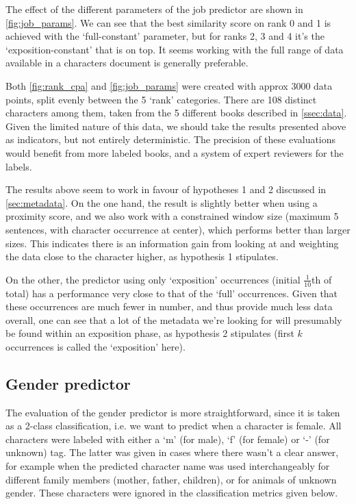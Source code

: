 The effect of the different parameters of the job predictor are shown in \cref{fig:job_params}. We can see that the best similarity score on rank 0 and 1 is achieved with the `full-constant' parameter, but for ranks 2, 3 and 4 it's the `exposition-constant' that is on top. It seems working with the full range of data available in a characters document is generally preferable.

Both \cref{fig:rank_cpa} and \cref{fig:job_params} were created with approx 3000 data points, split evenly between the 5 `rank' categories. There are 108 distinct characters among them, taken from the 5 different books described in \cref{ssec:data}. Given the limited nature of this data, we should take the results presented above as indicators, but not entirely deterministic. The precision of these evaluations would benefit from more labeled books, and a system of expert reviewers for the labels.

The results above seem to work in favour of hypotheses 1 and 2 discussed in \cref{sec:metadata}. On the one hand, the result is slightly better when using a proximity score, and we also work with a constrained window size (maximum 5 sentences, with character occurrence at center), which performs better than larger sizes. This indicates there is an information gain from looking at and weighting the data close to the character higher, as hypothesis 1 stipulates. 

On the other, the predictor using only `exposition' occurrences (initial $\frac{1}{10}$th of total) has a performance very close to that of the `full' occurrences. Given that these occurrences are much fewer in number, and thus provide much less data overall, one can see that a lot of the metadata we're looking for will presumably be found within an exposition phase, as hypothesis 2 stipulates (first $k$ occurrences is called the `exposition' here).

\subsection{Gender predictor}
The evaluation of the gender predictor is more straightforward, since it is taken as a 2-class classification, i.e. we want to predict when a character is female. All characters were labeled with either a `m' (for male), `f' (for female) or `-' (for unknown) tag. The latter was given in cases where there wasn't a clear answer, for example when the predicted character name was used interchangeably for different family members (mother, father, children), or for animals of unknown gender. These characters were ignored in the classification metrics given below.

